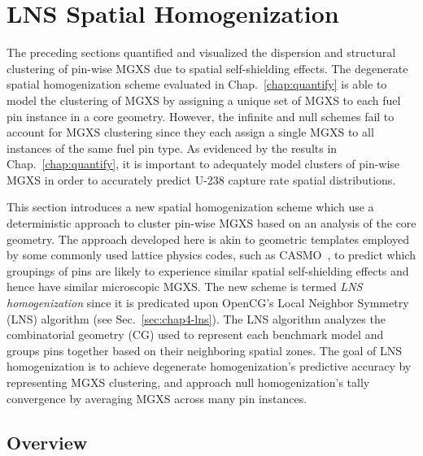 \section{LNS Spatial Homogenization}
\label{sec:chap9-lns-homogenize}

The preceding sections quantified and visualized the dispersion and structural clustering of pin-wise \ac{MGXS} due to spatial self-shielding effects. The degenerate spatial homogenization scheme evaluated in Chap.~\ref{chap:quantify} is able to model the clustering of \ac{MGXS} by assigning a unique set of \ac{MGXS} to each fuel pin instance in a core geometry. However, the infinite and null schemes fail to account for \ac{MGXS} clustering since they each assign a single \ac{MGXS} to all instances of the same fuel pin type. As evidenced by the results in Chap.~\ref{chap:quantify}, it is important to adequately model clusters of pin-wise \ac{MGXS} in order to accurately predict U-238 capture rate spatial distributions. 

This section introduces a new spatial homogenization scheme which use a deterministic  approach to cluster pin-wise \ac{MGXS} based on an analysis of the core geometry. The approach developed here is akin to geometric templates employed by some commonly used lattice physics codes, such as CASMO~\cite{rhodes2006casmo}, to predict which groupings of pins are likely to experience similar spatial self-shielding effects and hence have similar microscopic \ac{MGXS}. The new scheme is termed \textit{\ac{LNS} homogenization} since it is predicated upon OpenCG's Local Neighbor Symmetry (LNS) algorithm (see Sec.~\ref{sec:chap4-lns}). The \ac{LNS} algorithm analyzes the combinatorial geometry (CG) used to represent each benchmark model and groups pins together based on their neighboring spatial zones. The goal of \ac{LNS} homogenization is to achieve degenerate homogenization's predictive accuracy by representing \ac{MGXS} clustering, and approach null homogenization's tally convergence by averaging \ac{MGXS} across many pin instances.

\subsection{Overview}
\label{subsec:chap9-lns-overview}

